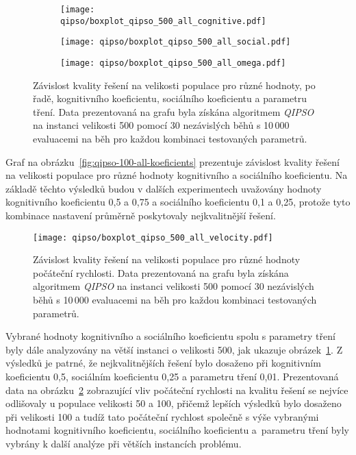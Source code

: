 \begin{figure}[ht!]
    \centering
    \begin{subfigure}[b]{0.48\textwidth}
        \centering
        \texttt{[image: qipso/boxplot\_qipso\_500\_all\_cognitive.pdf]}
    \end{subfigure}
    \hfill
    \begin{subfigure}[b]{0.48\textwidth}
        \centering
        \texttt{[image: qipso/boxplot\_qipso\_500\_all\_social.pdf]}
    \end{subfigure}

    \begin{subfigure}[b]{0.48\textwidth}
        \centering
        \texttt{[image: qipso/boxplot\_qipso\_500\_all\_omega.pdf]}
    \end{subfigure}
    \caption{Závislost kvality řešení na velikosti populace pro různé hodnoty, po řadě, kognitivního koeficientu, sociálního koeficientu a parametru tření. Data prezentovaná na grafu byla získána algoritmem \emph{QIPSO} na instanci velikosti 500 pomocí 30 nezávislých běhů s 10\,000 evaluacemi na běh pro každou kombinaci testovaných parametrů.}
    \label{fig:qipso-500-koef}
\end{figure}

Graf na obrázku~\ref{fig:qipso-100-all-koeficients} prezentuje závislost kvality řešení na velikosti populace pro různé hodnoty kognitivního a sociálního koeficientu.  
Na základě těchto výsledků budou v dalších experimentech uvažovány hodnoty kognitivního koeficientu 0{,}5 a 0{,}75 a sociálního koeficientu 0{,}1 a 0{,}25, protože tyto kombinace nastavení průměrně poskytovaly nejkvalitnější řešení. 

\begin{figure}[ht!]
    \centering
    \texttt{[image: qipso/boxplot\_qipso\_500\_all\_velocity.pdf]}
    \caption{Závislost kvality řešení na velikosti populace pro různé hodnoty počáteční rychlosti. Data prezentovaná na grafu byla získána algoritmem \emph{QIPSO} na instanci velikosti 500 pomocí 30 nezávislých běhů s 10\,000 evaluacemi na běh pro každou kombinaci testovaných parametrů.}
    \label{fig:qipso-500-velocity}
\end{figure}

Vybrané hodnoty kognitivního a sociálního koeficientu spolu s parametry tření byly dále analyzovány na větší instanci o velikosti 500, jak ukazuje obrázek~\ref{fig:qipso-500-koef}.
Z výsledků je patrné, že nejkvalitnějších řešení bylo dosaženo při kognitivním koeficientu 0,5, sociálním koeficientu 0,25 a parametru tření 0,01.
Prezentovaná data na obrázku~\ref{fig:qipso-500-velocity} zobrazující vliv počáteční rychlosti na kvalitu řešení se nejvíce odlišovaly u populace velikosti 50 a 100, přičemž lepších výsledků bylo dosaženo při velikosti 100 a tudíž tato počáteční rychlost společně s výše vybranými hodnotami kognitivního koeficientu, sociálního koeficientu a~parametru tření byly vybrány k další analýze při větších instancích problému. 

